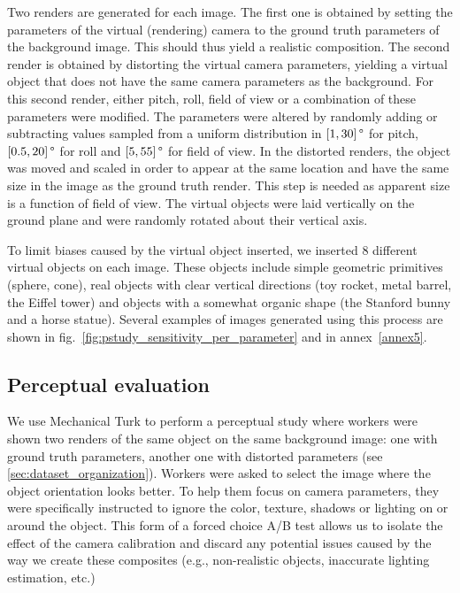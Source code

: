 Two renders are generated for each image. The first one is obtained by setting the parameters of the virtual (rendering) camera to the ground truth parameters of the background image. This should thus yield a realistic composition. The second render is obtained by distorting the virtual camera parameters, yielding a virtual object that does not have the same camera parameters as the background. For this second render, either pitch, roll, field of view or a combination of these parameters were modified. The parameters were altered by randomly adding or subtracting values sampled from a uniform distribution in $\left[ 1, 30 \right]\degree$ for pitch, $ \left[ 0.5, 20 \right]\degree$ for roll and $\left[ 5, 55\right]\degree$ for field of view. In the distorted renders, the object was moved and scaled in order to appear at the same location and have the same size in the image as the ground truth render. This step is needed as apparent size is a function of field of view. The virtual objects were laid vertically on the ground plane and were randomly rotated about their vertical axis.

To limit biases caused by the virtual object inserted, we inserted 8 different virtual objects on each image. These objects include simple geometric primitives (sphere, cone), real objects with clear vertical directions (toy rocket, metal barrel, the Eiffel tower) and objects with a somewhat organic shape (the Stanford bunny and a horse statue). Several examples of images generated using this process are shown in fig.~\ref{fig:pstudy_sensitivity_per_parameter} and in annex~\ref{annex5}.

\subsection{Perceptual evaluation}
\label{sec:hsa_perceptual_evaluation}

We use Mechanical Turk to perform a perceptual study where workers were shown two renders of the same object on the same background image: one with ground truth parameters, another one with distorted parameters (see \ref{sec:dataset_organization}). Workers were asked to select the image where the object orientation looks better. To help them focus on camera parameters, they were specifically instructed to ignore the color, texture, shadows or lighting on or around the object. This form of a forced choice A/B test allows us to isolate the effect of the camera calibration and discard any potential issues caused by the way we create these composites (e.g., non-realistic objects, inaccurate lighting estimation, etc.)

